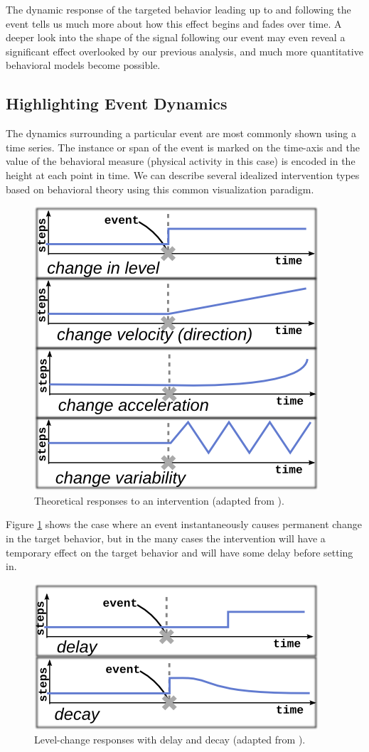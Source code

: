\documentclass[review,journal]{vgtc}         %
\begin{document}
The dynamic response of the targeted behavior leading up to and following the event tells us much  more about how this effect begins and fades over time.
A deeper look into the shape of the signal following our event may even reveal a significant effect overlooked by our previous analysis, and much more quantitative behavioral models become possible.

\subsection{Highlighting Event Dynamics}
The dynamics surrounding a particular event are most commonly shown using a time series.
The instance or span of the event is marked on the time-axis and the value of the behavioral measure (physical activity in this case) is encoded in the height at each point in time.
We can describe several idealized intervention types based on behavioral theory using this common visualization paradigm.

\begin{figure}
\centering
\includegraphics[width=0.6\columnwidth]{./img/exampleDynamicSignals.png}
\caption{Theoretical responses to an intervention (adapted from \cite{glass1975}).}
\label{fig:exampleSignals}
\end{figure}

Figure \ref{fig:exampleSignals} shows the case where an event instantaneously causes permanent change in the target behavior, but in the many cases the intervention will have a temporary effect on the target behavior and will have some delay before setting in.

\begin{figure}
\centering
\includegraphics[width=0.6\columnwidth]{./img/exampleDynamicComplications.png}
\caption{Level-change responses with delay and decay (adapted from \cite{glass1975}).}
\label{fig:exampleComplications}
\end{figure}
\end{document}
